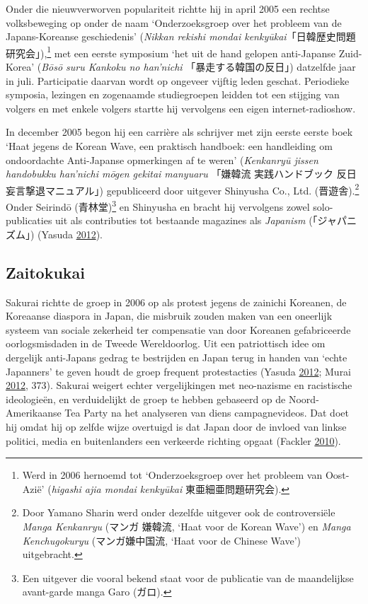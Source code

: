 \documentclass[10.5pt,dutch,]{article}
\begin{document}
Onder die nieuwverworven populariteit richtte hij in april 2005 een
rechtse volksbeweging op onder de naam `Onderzoeksgroep over het
probleem van de Japans-Koreanse geschiedenis' (\emph{Nikkan rekishi
mondai kenkyūkai}「日韓歴史問題研究会」),\footnote{Werd in 2006 hernoemd
  tot `Onderzoeksgroep over het probleem van Oost-Azië' (\emph{higashi
  ajia mondai kenkyūkai} 東亜細亜問題研究会).} met een eerste symposium
`het uit de hand gelopen anti-Japanse Zuid-Korea' (\emph{Bōsō suru
Kankoku no han'nichi} 「暴走する韓国の反日」) datzelfde jaar in juli.
Participatie daarvan wordt op ongeveer vijftig leden geschat. Periodieke
symposia, lezingen en zogenaamde studiegroepen leidden tot een stijging
van volgers en met enkele volgers startte hij vervolgens een eigen
internet-radioshow.

In december 2005 begon hij een carrière als schrijver met zijn eerste
eerste boek `Haat jegens de Korean Wave, een praktisch handboek: een
handleiding om ondoordachte Anti-Japanse opmerkingen af te weren'
(\emph{Kenkanryū jissen handobukku han'nichi mōgen gekitai manyuaru}
「嫌韓流 実践ハンドブック 反日妄言撃退マニュアル」) gepubliceerd door
uitgever Shinyusha Co., Ltd. (晋遊舎).\footnote{Door Yamano Sharin werd
  onder dezelfde uitgever ook de controversiële \emph{Manga Kenkanryu}
  (マンガ 嫌韓流, `Haat voor de Korean Wave') en \emph{Manga
  Kenchugokuryu} (マンガ嫌中国流, `Haat voor de Chinese Wave')
  uitgebracht.} Onder Seirindō (青林堂)\footnote{Een uitgever die vooral
  bekend staat voor de publicatie van de maandelijkse avant-garde manga
  Garo (ガロ).} en Shinyusha en bracht hij vervolgens zowel
solo-publicaties uit als contributies tot bestaande magazines als
\emph{Japanism} (「ジャパニズム」) (Yasuda
\protect\hyperlink{ref-yasudaux5fnettoux5f2012}{2012}).

\subsection{Zaitokukai}\label{zaitokukai}

Sakurai richtte de groep in 2006 op als protest jegens de zainichi
Koreanen, de Koreaanse diaspora in Japan, die misbruik zouden maken van
een oneerlijk systeem van sociale zekerheid ter compensatie van door
Koreanen gefabriceerde oorlogsmisdaden in de Tweede Wereldoorlog. Uit
een patriottisch idee om dergelijk anti-Japans gedrag te bestrijden en
Japan terug in handen van `echte Japanners' te geven houdt de groep
frequent protestacties (Yasuda
\protect\hyperlink{ref-yasudaux5fnettoux5f2012}{2012}; Murai
\protect\hyperlink{ref-muraiux5fnetux5f2012}{2012}, 373). Sakurai
weigert echter vergelijkingen met neo-nazisme en racistische
ideologieën, en verduidelijkt de groep te hebben gebaseerd op de
Noord-Amerikaanse Tea Party na het analyseren van diens campagnevideos.
Dat doet hij omdat hij op zelfde wijze overtuigd is dat Japan door de
invloed van linkse politici, media en buitenlanders een verkeerde
richting opgaat (Fackler
\protect\hyperlink{ref-facklerux5fnewux5f2010}{2010}).
\end{document}
